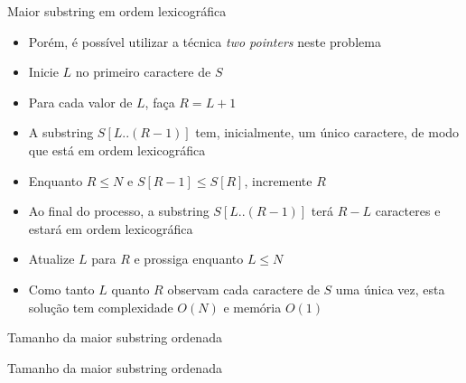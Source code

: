 \begin{frame}[fragile]{Maior substring em ordem lexicográfica}

    \begin{itemize}
        \item Porém, é possível utilizar a técnica \textit{two pointers} neste problema

        \item Inicie $L$ no primeiro caractere de $S$

        \item Para cada valor de $L$, faça $R = L + 1$

        \item A substring $S[L..(R - 1)]$ tem, inicialmente, um único caractere, de modo que
            está em ordem lexicográfica

        \item Enquanto $R\leq N$ e $S[R - 1] \leq S[R]$, incremente $R$

        \item Ao final do processo, a substring $S[L..(R - 1)]$ terá $R - L$ caracteres e estará
            em ordem lexicográfica

        \item Atualize $L$ para $R$ e prossiga enquanto $L\leq N$

        \item Como tanto $L$ quanto $R$ observam cada caractere de $S$ uma única vez, esta 
            solução tem complexidade $O(N)$ e memória $O(1)$
    \end{itemize}

\end{frame}

\begin{frame}[fragile]{Tamanho da maior substring ordenada}
\end{frame}

\begin{frame}[fragile]{Tamanho da maior substring ordenada}
\end{frame}

